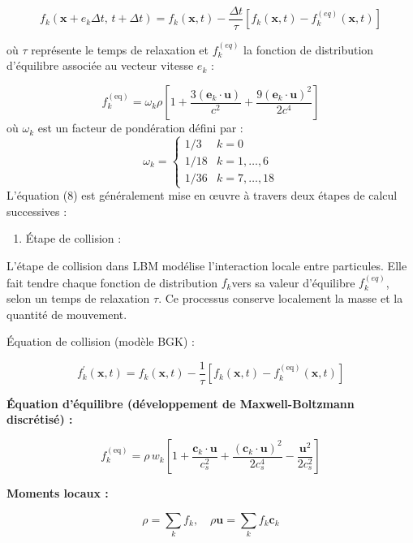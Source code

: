 \documentclass[12pt,a4paper]{report}
\begin{document}
\[
f_k(\mathbf{x}+e_k\Delta t,\, t+\Delta t)
=
f_k(\mathbf{x},t)
-
\frac{\Delta t}{\tau}
\left[
f_k(\mathbf{x},t)-f_k^{(eq)}(\mathbf{x},t)
\right]
\]

où $\tau$ représente le temps de relaxation et
$f_k^{(eq)}$ la fonction de distribution d’équilibre
associée au vecteur vitesse $e_k$ :

\begin{equation}
f_k^{(\text{eq})} = \omega_k \rho \left[ 1 + \frac{3(\mathbf{e}_k \cdot \mathbf{u})}{c^2} + \frac{9(\mathbf{e}_k \cdot \mathbf{u})^2}{2c^4} \right]
\label{eq:equilibrium}
\end{equation}
où \( \omega_k \) est un facteur de pondération défini par :
\begin{equation}
\omega_k =
\begin{cases} 
1/3 & k = 0 \\
1/18 & k = 1, \dots, 6 \\
1/36 & k = 7, \dots, 18
\end{cases}
\label{eq:omega}
\end{equation}
L’équation (8) est généralement mise en œuvre à travers deux étapes de calcul successives :

\begin{enumerate}
    \item Étape de collision :
\end{enumerate} 


L’étape de collision dans LBM modélise l’interaction locale entre particules. Elle fait tendre chaque fonction de distribution $f_k$vers sa valeur d’équilibre $f_k^{(eq)}$, selon un temps de relaxation $\tau$. Ce processus conserve localement la masse et la quantité de mouvement.

Équation de collision (modèle BGK) :


\[
f_k^{'}(\mathbf{x}, t) = f_k(\mathbf{x}, t) - \frac{1}{\tau} \left[ f_k(\mathbf{x}, t) - f_k^{(\text{eq})}(\mathbf{x}, t) \right]
\]

\textbf{Équation d'équilibre (développement de Maxwell-Boltzmann discrétisé) :}

\[
f_k^{(\text{eq})} = \rho \, w_k \left[ 1 + \frac{\mathbf{c}_k \cdot \mathbf{u}}{c_s^2} + \frac{(\mathbf{c}_k \cdot \mathbf{u})^2}{2c_s^4} - \frac{\mathbf{u}^2}{2c_s^2} \right]
\]

\textbf{Moments locaux :}

\[
\rho = \sum_k f_k, \quad \rho \mathbf{u} = \sum_k f_k\mathbf{c}_k
\]
\end{document}
